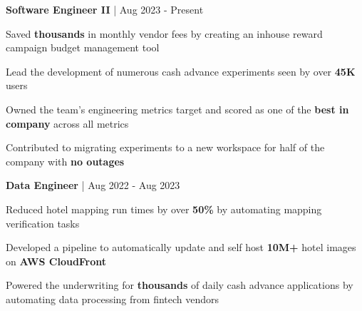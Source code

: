 


\begin{cventries}

\cventry
{\textbf{Software Engineer II} | \color{awesome}{Super}}
{Aug 2023 - Present} %
{ %
\begin{cvitems}
\item {Saved \textbf{thousands} in monthly vendor fees by creating an inhouse reward campaign budget management tool}
\item {Lead the development of numerous cash advance experiments seen by over \textbf{45K} users}
\item {Owned the team's engineering metrics target and scored as one of the \textbf{best in company} across all metrics}
\item {Contributed to migrating experiments to a new workspace for half of the company with \textbf{no outages}}
\end{cvitems}
}

\cventry
{\textbf{Data Engineer} | \color{awesome}{Super}}
{Aug 2022 - Aug 2023} %
{ %
\begin{cvitems}
\item {Reduced hotel mapping run times by over \textbf{50\%} by automating mapping verification tasks}
\item {Developed a pipeline to automatically update and self host \textbf{10M+} hotel images on \textbf{AWS CloudFront}}
\item {Powered the underwriting for \textbf{thousands} of daily cash advance applications by automating data processing from fintech vendors}
\end{cvitems}
}


\end{cventries}
